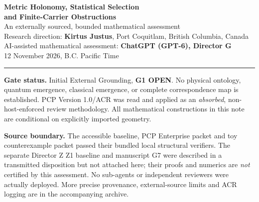 \documentclass[10pt,letterpaper]{article}
\theoremstyle{plain}\newtheorem{theorem}{Theorem}\newtheorem{proposition}{Proposition}
\theoremstyle{definition}\newtheorem{remark}{Remark}
\begin{document}
\begin{center}
{\Large\bfseries\color{navy} Metric Holonomy, Statistical Selection\\[2pt] and Finite-Carrier Obstructions}\\[9pt]
{\normalsize An externally sourced, bounded mathematical assessment}\\[5pt]
{\small Research direction: \textbf{Kirtus Justus}, Port Coquitlam, British Columbia, Canada}\\[2pt]
{\small AI-assisted mathematical assessment: \textbf{ChatGPT (GPT-6), Director G}}\\[5pt]
{\small 12 November 2026, B.C. Pacific Time}
\end{center}
\vspace{2pt}\hrule\vspace{9pt}
\textbf{Gate status.} Initial External Grounding, \textbf{G1 OPEN}. No physical ontology, quantum emergence, classical emergence, or complete correspondence map is established. PCP Version 1.0/ACR was read and applied as an \emph{absorbed}, non-host-enforced review methodology. All mathematical constructions in this note are conditional on explicitly imported geometry.

\textbf{Source boundary.} The accessible baseline, PCP Enterprise packet and toy counterexample packet passed their bundled local structural verifiers. The separate Director Z Z1 baseline and manuscript G7 were described in a transmitted disposition but not attached here; their proofs and numerics are \emph{not} certified by this assessment. No sub-agents or independent reviewers were actually deployed. More precise provenance, external-source limits and ACR logging are in the accompanying archive.
\end{document}
